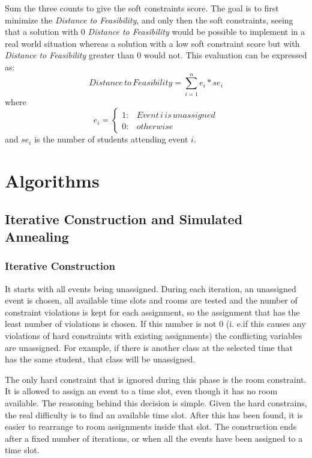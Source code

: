 \documentclass{llncs}
\begin{document}
Sum the three counts to give the soft constraints score. 
The goal is to first minimize the \textit{Distance to Feasibility}, and only then the soft constraints, seeing that a solution with 0 \textit{Distance to Feasibility} would be possible to implement in a real world situation whereas a solution with a low soft constraint score but with \textit{Distance to Feasibility} greater than 0 would not. This evaluation can be expressed as:
$$
Distance\,to\,Feasibility = \sum_{i=1}^n e_i*se_i $$ where $$
 e_i = \left\{
     \begin{array}{ll}
       1  : & Event\, i\, is\, unassigned \\
       0  : & otherwise
     \end{array}
   \right.
$$ and $ se_i $ is the number of students attending event $i$.
  
  
  




\section{Algorithms}


\subsection{Iterative Construction and Simulated Annealing}

\subsubsection{Iterative Construction}

It starts with all events being unassigned. During each iteration, an unassigned
event is chosen, all available time slots and rooms are tested and the number of constraint violations is kept for each assignment, so the assignment that has the least number of violations is chosen. If this number is not 0 (i. e.if this causes any violations of hard constraints with existing assignments) the conflicting variables are unassigned. For example, if there is another class at the selected time that has the same student, that class will be unassigned.

The only hard constraint that is ignored during this phase is the room constraint. It is allowed to assign an event to a time slot, even though it has no room available. The reasoning behind this decision is simple. Given the hard constrains, the real difficulty is to find an available time slot. After this has been found, it is easier to rearrange to room assignments inside that slot. The construction ends after a fixed number of iterations, or when all the events have been assigned to a time slot.
\end{document}
